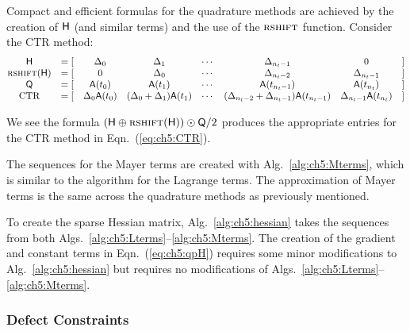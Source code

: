 Compact and efficient formulas for the quadrature methods are achieved by the creation of $\textup{\textsf{H}}$ (and similar terms) and the use of the $\textsc{rshift}$ function.
Consider the CTR method: 
\begin{align}
\begin{matrix}
\textup{\textsf{H}} & =[& \Delta_0 & \Delta_1 & \cdots & \Delta_{n_t-1} & 0 &]  \\
\text{\textsc{rshift}}(\textup{\textsf{H}}) & =[&  0 & \Delta_0 & \cdots & \Delta_{n_t-2} & \Delta_{n_t-1} &] \\
\textup{\textsf{Q}} & =[&  \textup{\textsf{A}}(t_0) & \textup{\textsf{A}}(t_1) & \cdots & \textup{\textsf{A}}(t_{n_t-1}) & \textup{\textsf{A}}(t_{n_t})  &] \\
\text{CTR} & =[&  \Delta_0 \textup{\textsf{A}}(t_0) & (\Delta_0+\Delta_1) \textup{\textsf{A}}(t_1) & \cdots & (\Delta_{n_t-2}+\Delta_{n_t-1}) \textup{\textsf{A}}(t_{n_t-1}) & \Delta_{n_t-1} \textup{\textsf{A}}(t_{n_t}) &]
\end{matrix} 
\end{align}

\noindent We see the formula $\left( \textup{\textsf{H}} \oplus \text{\textsc{rshift}}(\textup{\textsf{H}}) \right)  \odot \textup{\textsf{Q}}/2$ produces the appropriate entries for the CTR method in Eqn.~(\ref{eq:ch5:CTR}).

The sequences for the Mayer terms are created with Alg.~\ref{alg:ch5:Mterms}, which is similar to the algorithm for the Lagrange terms.
The approximation of Mayer terms is the same across the quadrature methods as previously mentioned.

To create the sparse Hessian matrix, Alg.~\ref{alg:ch5:hessian} takes the sequences from both Algs.~\ref{alg:ch5:Lterms}--\ref{alg:ch5:Mterms}.
The creation of the gradient and constant terms in Eqn.~(\ref{eq:ch5:qpH}) requires some minor modifications to Alg.~\ref{alg:ch5:hessian} but requires no modifications of Algs.~\ref{alg:ch5:Lterms}--\ref{alg:ch5:Mterms}. 

\subsubsection{Defect Constraints}

